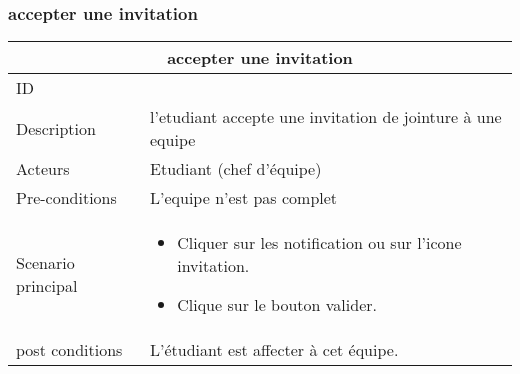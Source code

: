 \documentclass[11pt,fleqn]{book} %
\begin{document}
\subsubsection{accepter une invitation}
\begin{center}
\begin{tabularx}{1\textwidth} { | p{4cm} | >{\raggedright\arraybackslash}X |  }
  \hline
  \multicolumn{2}{|c|}{accepter une invitation} \\
 \hline
 ID & 3  \\
 \hline
 Description  & l'etudiant accepte une invitation de jointure à une equipe   \\
  \hline
 Acteurs  & Etudiant (chef d'équipe)  \\
  \hline
 Pre-conditions  & L'equipe n'est pas complet\\
 \hline
 Scenario principal  &  
 \begin{itemize}
     \item  Cliquer sur les notification ou sur l’icone invitation.
     \item Clique sur le bouton valider.

 \end{itemize}\\
  \hline
 post conditions  &  L’étudiant est affecter à cet équipe.  \\
  \hline
\end{tabularx}
\label{tbl:nicetablelesstable}
\end{center}
\end{document}
